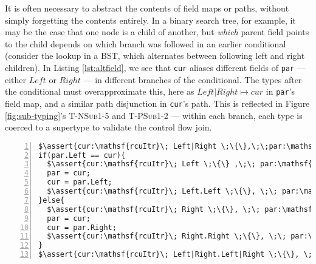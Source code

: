 It is often necessary to abstract the contents of field maps or paths, without simply forgetting the contents entirely.  In a binary search tree, for example, it may be the case that one node is a child of another, but \emph{which} parent field points to the child depends on which branch was followed in an earlier conditional (consider the lookup in a BST, which alternates between following left and right children).
In Listing \ref{lst:altfield}, we see that \texttt{cur} aliases different fields of \texttt{par} --- either $Left$ or $Right$ --- in different branches of the conditional.
The types after the conditional must overapproximate this, here as $Left|Right\mapsto cur$ in \texttt{par}'s field map, and a similar path disjunction in \texttt{cur}'s path.
This is reflected in Figure \ref{fig:sub-typing}'s \textsc{T-NSub1-5} and \textsc{T-PSub1-2} --- within each branch, each type is coerced to a supertype to validate the control flow join.
\begin{lstlisting}[caption={Choosing fields to read},label={lst:altfield},numbersep=1pt,xrightmargin=-1cm,xleftmargin=0.1\textwidth, numbers=left, numbersep=5pt,basicstyle=\scriptsize\ttfamily,float,floatplacement=H]
$\assert{cur:\mathsf{rcuItr}\; Left|Right \;\{\},\;\;par:\mathsf{rcuItr}\;  \epsilon \;\{Left|Right\mapsto cur\}}$
if(par.Left == cur){
  $\assert{cur:\mathsf{rcuItr}\; Left \;\{\} ,\;\; par:\mathsf{rcuItr}\;  \epsilon \;\{Left\mapsto cur\}}$
  par = cur;
  cur = par.Left;
  $\assert{cur:\mathsf{rcuItr}\; Left.Left \;\{\}, \;\; par:\mathsf{rcuItr}\;  Left \;\{Left\mapsto cur\}}$
}else{
  $\assert{cur:\mathsf{rcuItr}\; Right \;\{\}, \;\; par:\mathsf{rcuItr}\;  \epsilon \;\{Right\mapsto cur\}}$
  par = cur;
  cur = par.Right;
  $\assert{cur:\mathsf{rcuItr}\; Right.Right \;\{\}, \;\; par:\mathsf{rcuItr}\;  Right \;\{Right\mapsto cur\}}$
}
$\assert{cur:\mathsf{rcuItr}\; Left|Right.Left|Right \;\{\}, \;\; par:\mathsf{rcuItr}\;  Left|Right \;\{Left|Right\mapsto cur\}}$
\end{lstlisting}

